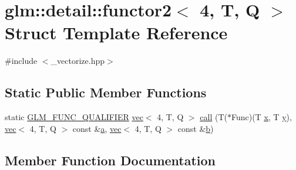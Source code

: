 \hypertarget{structglm_1_1detail_1_1functor2_3_014_00_01_t_00_01_q_01_4}{}\section{glm\+:\+:detail\+:\+:functor2$<$ 4, T, Q $>$ Struct Template Reference}
\label{structglm_1_1detail_1_1functor2_3_014_00_01_t_00_01_q_01_4}


{\ttfamily \#include $<$\+\_\+vectorize.\+hpp$>$}

\subsection*{Static Public Member Functions}
\begin{DoxyCompactItemize}
\item 
static \hyperlink{setup_8hpp_a33fdea6f91c5f834105f7415e2a64407}{G\+L\+M\+\_\+\+F\+U\+N\+C\+\_\+\+Q\+U\+A\+L\+I\+F\+I\+ER} \hyperlink{structglm_1_1vec}{vec}$<$ 4, T, Q $>$ \hyperlink{structglm_1_1detail_1_1functor2_3_014_00_01_t_00_01_q_01_4_aaf4c70145020e3cbfdc975eee7f9a9cd}{call} (T($\ast$Func)(T \hyperlink{_s_d_l__opengl_8h_ad0e63d0edcdbd3d79554076bf309fd47}{x}, T \hyperlink{_s_d_l__opengl_8h_a1675d9d7bb68e1657ff028643b4037e3}{y}), \hyperlink{structglm_1_1vec}{vec}$<$ 4, T, Q $>$ const \&\hyperlink{_s_d_l__opengl__glext_8h_a3309789fc188587d666cda5ece79cf82}{a}, \hyperlink{structglm_1_1vec}{vec}$<$ 4, T, Q $>$ const \&\hyperlink{_s_d_l__opengl__glext_8h_a0f71581a41fd2264c8944126dabbd010}{b})
\end{DoxyCompactItemize}


\subsection{Member Function Documentation}
\mbox{\label{structglm_1_1detail_1_1functor2_3_014_00_01_t_00_01_q_01_4_aaf4c70145020e3cbfdc975eee7f9a9cd}} 
